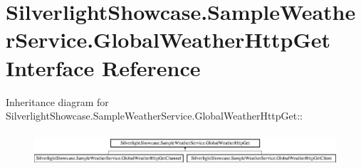 \hypertarget{interface_silverlight_showcase_1_1_sample_weather_service_1_1_global_weather_http_get}{
\section{SilverlightShowcase.SampleWeatherService.GlobalWeatherHttpGet Interface Reference}
\label{interface_silverlight_showcase_1_1_sample_weather_service_1_1_global_weather_http_get}
}
Inheritance diagram for SilverlightShowcase.SampleWeatherService.GlobalWeatherHttpGet::\begin{figure}[H]
\begin{center}
\leavevmode
\includegraphics[height=1.25843cm]{interface_silverlight_showcase_1_1_sample_weather_service_1_1_global_weather_http_get}
\end{center}
\end{figure}
